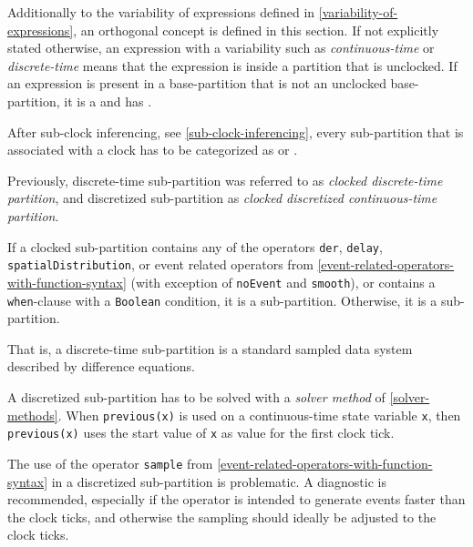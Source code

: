 Additionally to the variability of expressions defined in \cref{variability-of-expressions}, an orthogonal concept  is defined in this section.
If not explicitly stated otherwise, an expression with a variability such as \emph{continuous-time} or \emph{discrete-time} means that the expression is inside a partition that is unclocked.
If an expression is present in a base-partition that is not an unclocked base-partition, it is a  and has .

After sub-clock inferencing, see \cref{sub-clock-inferencing}, every sub-partition that is associated with a clock has to be categorized as  or .
\begin{nonnormative}
Previously, discrete-time sub-partition was referred to as \emph{clocked discrete-time partition}, and discretized sub-partition as \emph{clocked discretized continuous-time partition}.
\end{nonnormative}

If a clocked sub-partition contains any of the operators \lstinline!der!, \lstinline!delay!, \lstinline!spatialDistribution!, or event related operators from \cref{event-related-operators-with-function-syntax} (with exception of \lstinline!noEvent! and \lstinline!smooth!), or contains a \lstinline!when!-clause with a \lstinline!Boolean! condition, it is a  sub-partition.
Otherwise, it is a  sub-partition.

\begin{nonnormative}
That is, a discrete-time sub-partition is a standard sampled data system described by difference equations.
\end{nonnormative}

A discretized sub-partition has to be solved with a \emph{solver method} of \cref{solver-methods}.
When \lstinline!previous(x)! is used on a continuous-time state variable \lstinline!x!, then \lstinline!previous(x)! uses the start value of \lstinline!x! as value for the first clock tick.

The use of the operator \lstinline!sample! from \cref{event-related-operators-with-function-syntax} in a discretized sub-partition is problematic.
A diagnostic is recommended, especially if the operator is intended to generate events faster than the clock ticks, and otherwise the sampling should ideally be adjusted to the clock ticks.

